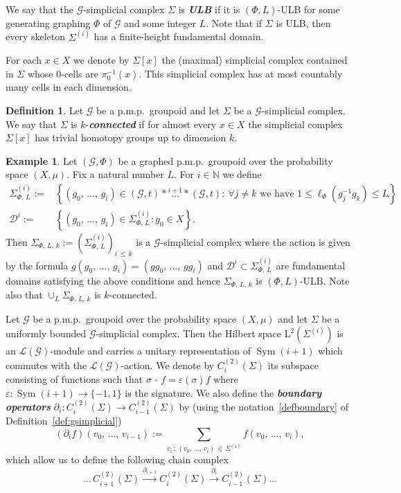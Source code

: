 \documentclass[10pt]{amsart}
\theoremstyle{definition}
\newtheorem{defi}[cdrthm]{Definition}
\newtheorem{exam}[cdrthm]{Example}
\newcommand{\defin}[1]{\textbf{\emph{#1}}}
\newcommand{\Nmath}{\mathbb{N}}
\newcommand{\cg}{\mathcal{G}}
\newcommand{\cd}{\mathcal{D}}
\newcommand{\LLh}{\mathrm{L}}
\DeclareMathOperator{\Sym}{Sym}
\newcommand{\pmp}{p.m.p.\ }
\newcommand{\lvN}{\mathcal{L}(\cg)}
\let\oldforall\forall
\renewcommand*{\forall}{\mathrel{\oldforall}}
\begin{document}
We say that the $\cg$-simplicial complex $\Sigma$ is
\defin{ULB} if it is $(\Phi,L)$-ULB for some generating graphing $\Phi$ of $\cg$ and some integer $L$. Note that if $\Sigma$ is ULB, then every skeleton $\Sigma^{(i)}$ has a finite-height fundamental domain.


For each $x\in X$ we denote by $\Sigma[x]$ the (maximal) simplicial complex contained in $\Sigma$ whose $0$-cells are $\pi^{-1}_0(x)$. This simplicial complex has at most countably many cells in each dimension.

\begin{defi}
Let $\cg$ be a \pmp groupoid and let $\Sigma$ be a $\cg$-simplicial complex. We say that $\Sigma$ is $k$-\defin{connected} if for almost every $x\in X$ the simplicial complex $\Sigma[x]$ has trivial homotopy groups up to dimension $k$.
\end{defi}

\begin{exam}\label{ex:universal}
Let $(\cg,\Phi)$ be a graphed \pmp groupoid over the probability space $(X,\mu)$. Fix a natural number $L$. For $i\in\Nmath$ we define
\begin{align*}
\Sigma_{\Phi,\,L}^{(i)}:=&\left\{\left(g_0,\,\ldots,\,g_i\right)\in(\cg,t)*\stackrel{i+1}{\ldots}*(\cg,t):\ \forall j\neq k\text{ we have }1\leq \ell_\Phi\left(g_j^{-1}g_k\right)\leq L\right\},\\
\cd^i:=&\left\{\left(g_0,\,\ldots,\,g_i\right)\in \Sigma_{\Phi,\,L}^{(i)} : g_0\in X\right\}.
\end{align*}
Then $\Sigma_{\Phi,\,L,\,k}:=(\Sigma_{\Phi,\,L}^{(i)})_{i\,\leq\,k}$ is a $\cg$-simplicial complex where the action is given by the formula $g(g_0,\,\ldots,\,g_i)=(gg_0,\,\ldots,\,gg_i)$ and $\cd^i\subset \Sigma_{\Phi,\,L}^{(i)}$ are fundamental domains satisfying the above conditions and hence $\Sigma_{\Phi,\,L,\,k}$ is $(\Phi,L)$-ULB. Note also that $\cup_L \Sigma_{\Phi,\,L,\,k}$ is $k$-connected.
\end{exam}

Let $\cg$ be a \pmp groupoid over the probability space $(X,\mu)$ and let $\Sigma$ be a uniformly bounded $\cg$-simplicial complex. Then the Hilbert space $\LLh^2(\Sigma^{(i)})$ is an $\lvN$-module and carries a unitary representation of $\Sym(i+1)$ which commutes with the $\lvN$-action. We denote by $C_i^{(2)}(\Sigma)$ its subspace consisting of functions such that $\sigma\,\cdot\,f = \varepsilon(\sigma) f$ where $\varepsilon \colon \Sym(i+1)\to \{-1,1\}$ is the signature. We also define the
\defin{boundary operators} $\partial_i \colon C_i^{(2)}(\Sigma) \to C_{i-1}^{(2)}(\Sigma)$ by (using the notation~\eqref{defboundary} of Definition~\ref{def:gsimplicial})
\begin{equation}\label{eq:def_of_boundary}
(\partial_i f)(v_0,\,\dots,\,v_{i-1}) := \sum_{v_i\,:\,(v_0,\,\dots,\,v_i)\,\in\,\Sigma^{(i)}} f(v_0,\,\dots,\,v_i),
\end{equation}
which allow us to define the following chain complex
\[
\ldots\,C_{i+1}^{(2)}(\Sigma)\stackrel{\partial_{i+1}}{\rightarrow} C_{i}^{(2)}(\Sigma)\stackrel{\partial_{i}}{\rightarrow} C_{i-1}^{(2)}(\Sigma)\ldots
\]
\end{document}
